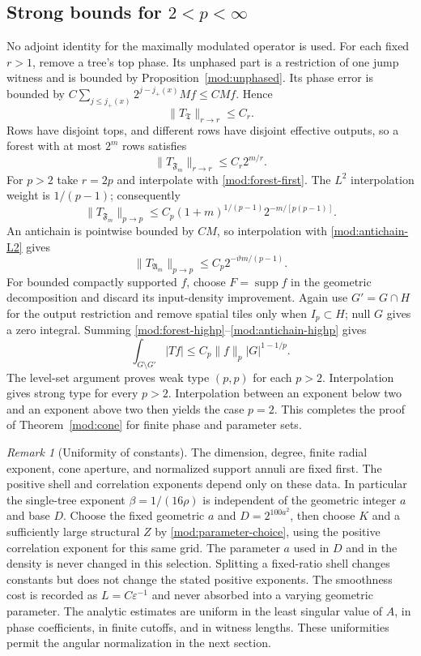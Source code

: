 \documentclass[11pt]{article}
\numberwithin{equation}{section}
\theoremstyle{remark}
\newtheorem{remark}[theorem]{Remark}
\theoremstyle{definition}
\newcommand{\TT}{\mathfrak T}
\begin{document}
\subsection{Strong bounds for \texorpdfstring{$2<p<\infty$}{2<p<infinity}}
No adjoint identity for the maximally modulated operator is used.
For each fixed $r>1$, remove a tree's top phase. Its unphased part is a
restriction of one jump witness and is bounded by
Proposition~\ref{mod:unphased}. Its phase error is bounded by
$C\sum_{j\le j_+(x)}2^{j-j_+(x)}Mf\le CMf$. Hence
\[
 \|T_\TT\|_{r\to r}\le C_r.
\]
Rows have disjoint tops, and different rows have disjoint effective
outputs, so a forest with at most $2^m$ rows satisfies
\[
 \|T_{\mathfrak F_m}\|_{r\to r}\le C_r2^{m/r}.
\]
For $p>2$ take $r=2p$ and interpolate with
\eqref{mod:forest-first}. The $L^2$ interpolation weight is
$1/(p-1)$; consequently
\begin{equation}\label{mod:forest-highp}
 \|T_{\mathfrak F_m}\|_{p\to p}
 \le C_p(1+m)^{1/(p-1)}2^{-m/[p(p-1)]}.
\end{equation}
An antichain is pointwise bounded by $CM$, so interpolation with
\eqref{mod:antichain-L2} gives
\begin{equation}\label{mod:antichain-highp}
 \|T_{\mathfrak A_m}\|_{p\to p}
 \le C_p2^{-\vartheta m/(p-1)}.
\end{equation}
For bounded compactly supported $f$, choose $F=\operatorname{supp}f$ in
the geometric decomposition and discard its input-density improvement.
Again use $G'=G\cap H$ for the output restriction and remove spatial
tiles only when $I_p\subset H$; null $G$ gives a zero integral.
Summing \eqref{mod:forest-highp}--\eqref{mod:antichain-highp} gives
\[
 \int_{G\setminus G'}|Tf|
 \le C_p\|f\|_p|G|^{1-1/p}.
\]
The level-set argument proves weak type $(p,p)$ for each $p>2$.
Interpolation gives strong type for every $p>2$. Interpolation between an exponent below two and an exponent above two
then yields the case $p=2$. This completes the proof of
Theorem~\ref{mod:cone} for finite phase and parameter sets.

\begin{remark}[Uniformity of constants]\label{mod:uniformity}
The dimension, degree, finite radial exponent, cone aperture, and
normalized support annuli are fixed first. The positive shell and
correlation exponents depend only on these data. In particular the
single-tree exponent $\beta=1/(16\rho)$ is independent of the geometric
integer $a$ and base $D$. Choose the fixed geometric $a$ and
$D=2^{100a^2}$, then choose $K$ and a sufficiently large structural $Z$
by \eqref{mod:parameter-choice}, using the positive correlation exponent
for this same grid. The parameter $a$ used in $D$ and in the density is
never changed in this selection. Splitting a fixed-ratio shell changes
constants but does not change the stated positive exponents.
The smoothness cost is recorded as $L=C\varepsilon^{-1}$ and never
absorbed into a varying geometric parameter. The analytic estimates are
uniform in the least singular value of $A$, in phase coefficients, in
finite cutoffs, and in witness lengths. These uniformities permit the angular normalization in the next section.
\end{remark}
\end{document}
